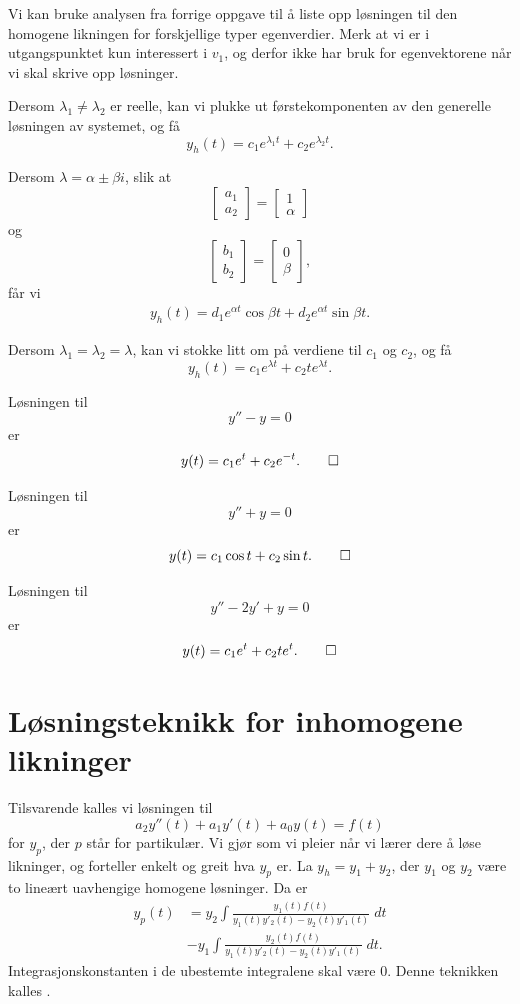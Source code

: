 Vi kan bruke analysen fra forrige oppgave til å liste opp løsningen til den homogene likningen for forskjellige typer egenverdier. 
Merk at vi er i utgangspunktet kun interessert i $v_1$, og derfor ikke har bruk for egenvektorene når vi skal skrive opp løsninger.

Dersom $\lambda_1 \neq \lambda_2$ er reelle, kan vi plukke ut førstekomponenten av den generelle løsningen av systemet, og få
\[
y_h(t)=c_1e^{\lambda_1 t}+c_2e^{\lambda_2 t}.
\]

Dersom $\lambda=\alpha \pm \beta i$, slik at 
\[
\begin{bmatrix}
a_1 \\ a_2
\end{bmatrix}
=
\begin{bmatrix}
1 \\ \alpha
\end{bmatrix}
\]
og
\[
\begin{bmatrix}
b_1 \\ b_2
\end{bmatrix}
=
\begin{bmatrix}
0 \\ \beta
\end{bmatrix},
\]
får vi 
\begin{align*}
y_h(t)=d_1e^{\alpha t}\cos\beta t+d_2e^{\alpha t}\sin\beta t.
\end{align*}

Dersom $\lambda_1=\lambda_2=\lambda$, kan vi stokke litt om på verdiene til $c_1$ og $c_2$, og få
\[
y_h(t)=c_1e^{\lambda t}+c_2te^{\lambda t}.
\]

\begin{ex}
Løsningen til 
\[
y''-y=0
\]
er
\[
y(t)=c_1e^t+c_2e^{-t}. \qedhere
\]
\end{ex}


\begin{ex}
Løsningen til 
\[
y''+y=0
\]
er
\[
y(t)=c_1\cos t+c_2\sin t. \qedhere
\]
\end{ex}

\begin{ex}
Løsningen til 
\[
y''-2y'+y=0
\]
er
\[
y(t)=c_1e^t+c_2te^t. \qedhere
\]
\end{ex}


\section*{Løsningsteknikk for inhomogene likninger}
Tilsvarende kalles vi løsningen til
\[
a_2y''(t)+a_1y'(t)+a_0y(t)=f(t)
\]
for $y_p$, der $p$ står for partikulær. Vi gjør som vi pleier når vi lærer dere å løse likninger, og forteller enkelt og greit hva $y_p$ er. 
La $y_h=y_1+y_2$, der $y_1$ og $y_2$ være to lineært uavhengige homogene løsninger. 
Da er
\begin{align*}
y_p(t)&=y_2\int \frac{y_1(t)f(t)}{y_1(t)y'_2(t)-y_2(t)y'_1(t)}\; dt \\ &-y_1\int \frac{y_2(t)f(t)}{y_1(t)y'_2(t)-y_2(t)y'_1(t)}\; dt.
\end{align*}
Integrasjonskonstanten i de ubestemte integralene skal være 0. 
Denne teknikken kalles .

